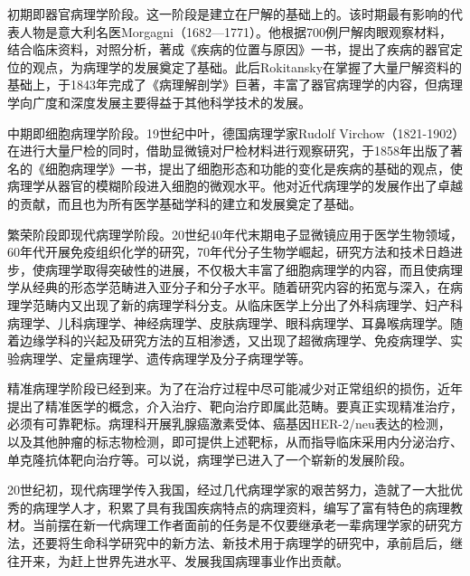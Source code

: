 初期即器官病理学阶段。这一阶段是建立在尸解的基础上的。该时期最有影响的代表人物是意大利名医Morgagni（1682---1771）。他根据700例尸解肉眼观察材料，结合临床资料，对照分析，著成《疾病的位置与原因》一书，提出了疾病的器官定位的观点，为病理学的发展奠定了基础。此后Rokitansky在掌握了大量尸解资料的基础上，于1843年完成了《病理解剖学》巨著，丰富了器官病理学的内容，但病理学向广度和深度发展主要得益于其他科学技术的发展。

中期即细胞病理学阶段。19世纪中叶，德国病理学家Rudolf
Virchow（1821-1902）在进行大量尸检的同时，借助显微镜对尸检材料进行观察研究，于1858年出版了著名的《细胞病理学》一书，提出了细胞形态和功能的变化是疾病的基础的观点，使病理学从器官的模糊阶段进入细胞的微观水平。他对近代病理学的发展作出了卓越的贡献，而且也为所有医学基础学科的建立和发展奠定了基础。

繁荣阶段即现代病理学阶段。20世纪40年代末期电子显微镜应用于医学生物领域，60年代开展免疫组织化学的研究，70年代分子生物学崛起，研究方法和技术日趋进步，使病理学取得突破性的进展，不仅极大丰富了细胞病理学的内容，而且使病理学从经典的形态学范畴进入亚分子和分子水平。随着研究内容的拓宽与深入，在病理学范畴内又出现了新的病理学科分支。从临床医学上分出了外科病理学、妇产科病理学、儿科病理学、神经病理学、皮肤病理学、眼科病理学、耳鼻喉病理学。随着边缘学科的兴起及研究方法的互相渗透，又出现了超微病理学、免疫病理学、实验病理学、定量病理学、遗传病理学及分子病理学等。

精准病理学阶段已经到来。为了在治疗过程中尽可能减少对正常组织的损伤，近年提出了精准医学的概念，介入治疗、靶向治疗即属此范畴。要真正实现精准治疗，必须有可靠靶标。病理科开展乳腺癌激素受体、癌基因HER-2/neu表达的检测，以及其他肿瘤的标志物检测，即可提供上述靶标，从而指导临床采用内分泌治疗、单克隆抗体靶向治疗等。可以说，病理学已进入了一个崭新的发展阶段。

20世纪初，现代病理学传入我国，经过几代病理学家的艰苦努力，造就了一大批优秀的病理学人才，积累了具有我国疾病特点的病理资料，编写了富有特色的病理教材。当前摆在新一代病理工作者面前的任务是不仅要继承老一辈病理学家的研究方法，还要将生命科学研究中的新方法、新技术用于病理学的研究中，承前启后，继往开来，为赶上世界先进水平、发展我国病理事业作出贡献。

